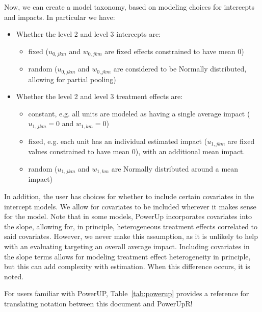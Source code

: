 \documentclass[12pt]{article}
\begin{document}
Now, we can create a model taxonomy, based on modeling choices for intercepts and impacts.
In particular we have:
\begin{itemize}
\item Whether the level 2 and level 3 intercepts are:
\begin{itemize}
\item fixed ($u_{0,jkm}$ and $w_{0,jkm}$ are fixed effects constrained to have mean 0)
\item random ($u_{0,jkm}$ and $w_{0,jkm}$ are considered to be Normally distributed, allowing for partial pooling)
\end{itemize}
\item Whether the level 2 and level 3 treatment effects are:
\begin{itemize}
\item constant, e.g. all units are modeled as having a single average impact ($u_{1,jkm}= 0$ and $w_{1,km} = 0$)
\item fixed, e.g. each unit has an individual estimated impact ($u_{1,jkm}$ are fixed values constrained to have mean 0), with an additional mean impact.
\item random ($u_{1,jkm}$ and $w_{1,km}$ are Normally distributed around a mean impact)
\end{itemize}
\end{itemize}


In addition, the user has choices for whether to include certain covariates in the intercept models.
We allow for covariates to be included wherever it makes sense for the model.
Note that in some models, PowerUp incorporates covariates into the slope, allowing for, in principle, heterogeneous treatment effects correlated to said covariates.
However, we never make this assumption, as it is unlikely to help with an evaluating targeting an overall average impact.
Including covariates in the slope terms allows for modeling treatment effect heterogeneity in principle, but this can add complexity with estimation. When this difference occurs, it is noted.

For users familiar with PowerUP, Table~\ref{tab:powerup} provides a reference for translating notation between this document and PowerUpR!
\end{document}
